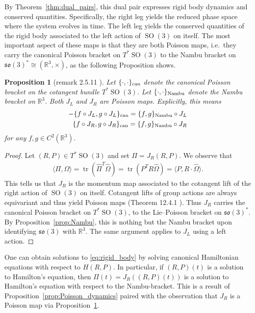 \documentclass[12pt]{amsart}
\newcommand{\so}{\ensuremath{\mathfrak{so}}}
\newtheorem{prop}[thm]{Proposition}
\DeclareMathOperator{\SO}{SO}
\DeclareMathOperator{\tr}{tr}
\begin{document}
  By Theorem~\ref{thm:dual_pairs}, this dual pair expresses rigid
  body dynamics and conserved quantities.
  Specifically, the right leg yields the reduced phase space where 
  the system evolves in time.
  The left leg yields the conserved quantities of the rigid body
  associated to the left action of $\SO(3)$ on itself.
  The most important aspect of these maps is that they are both Poisson
  maps, i.e.\ they carry the canonical Poisson bracket on $T^* \SO(3)$
  to the Nambu bracket on $\so(3)^* \cong (\mathbb{R}^3,\times)$,
  as the following Proposition shows.

  \begin{prop}[remark 2.5.11 \cite{HolmBook2}] \label{prop:SO3_to_Nambu}
    Let $\{ \cdot , \cdot \}_{\rm can}$ denote the canonical Poisson bracket
    on the cotangent bundle $T^* \SO(3)$.
    Let $\{ \cdot , \cdot \}_{\rm Nambu}$ denote the Nambu bracket on $\mathbb{R}^3$.
    Both $J_L$ and $J_R$ are Poisson maps.
    Explicitly, this means
    \begin{align*}
      -\{ f \circ J_L , g \circ J_L \}_{\rm can} = \{ f , g \}_{\rm Nambu} \circ J_L \\
      \{ f \circ J_R , g \circ J_R \}_{\rm can} = \{ f , g \}_{\rm Nambu} \circ J_R \\
    \end{align*}
    for any $f,g \in C^2( \mathbb{R}^3)$.
  \end{prop}
  \begin{proof}
    Let $(R,P) \in T^* \SO(3)$ and set $\Pi = J_R(R,P)$.
    We observe that
    \begin{align*}
      \langle \Pi , \Omega \rangle
      = \tr( \hat{\Pi}^T \hat{\Omega} ) 
      = \tr( P^T R \hat{\Omega} ) 
      = \langle P , R \cdot \hat{\Omega} \rangle.
    \end{align*}
    This tells us that $J_R$ is the momentum map associated
    to the cotangent lift of the right action of $\SO(3)$ on itself.
    Cotangent lifts of group actions are always equivariant
    and thus yield Poisson maps (Theorem 12.4.1 \cite{MandS}).
    Thus $J_R$ carries the canonical
    Poisson bracket on $T^* \SO(3)$, to the Lie--Poisson
    bracket on $\so(3)^*$.
    By Proposition~\ref{prop:Nambu}, this is nothing but the
    Nambu bracket upon identifying $\so(3)$ with $\mathbb{R}^3$.
    The same argument applies to $J_L$ using a left action.
  \end{proof}

  One can obtain solutions to \eqref{eq:rigid_body}
  by solving canonical Hamiltonian equations with respect to $H(R,P)$.
  In particular, if $(R,P)(t)$ is a solution to Hamilton's equation,
  then $\Pi(t) = J_R( (R,P)(t))$ is a solution to Hamilton's equation
  with respect to the Nambu-bracket.
  This is a result of Proposition~\ref{prop:Poisson_dynamics}
  paired with the observation that $J_R$ is a Poisson map via
  Proposition~\ref{prop:SO3_to_Nambu}.
\end{document}
